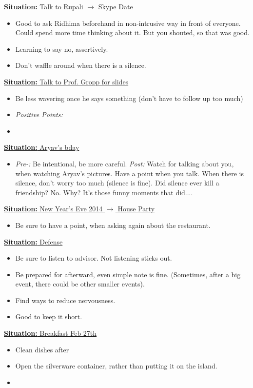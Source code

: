 \documentclass[11pt]{article}
\newcommand{\newSituation}[1]{\underline{\textbf{Situation:} #1} }
\begin{document}
\newSituation{Talk to Rupali $\rightarrow$ Skype Date} 
\begin{itemize}
\item Good to ask Ridhima beforehand in non-intrusive way in front of everyone. Could spend more time thinking about it. But you shouted, so that was good. 
\item Learning to say no, assertively.  
\item Don't waffle around when there is a silence. 
\end{itemize} 

\newSituation{Talk to Prof. Gropp for slides}
\begin{itemize} 
\tiny \item \tiny Be less wavering once he says something (don't have
to follow up too much) 
\item \textit{Positive Points:} 
\item
\end{itemize} 

\newSituation{Aryav's bday} 
\begin{itemize} 
\item  %
\textit{Pre-:} Be intentional, be more careful. \textit{Post:} Watch
for talking about you, when watching Aryav's pictures. Have a point when you
talk. When there is silence, don't worry too much (silence is
fine). Did silence ever kill a friendship? No. Why? It's those funny moments that did.... 
\end{itemize} 

\newSituation{New Year's Eve 2014 $\rightarrow$ House Party}
\begin{itemize} 
\item Be sure to have a point, when asking again about the restaurant. 
\end{itemize}

\newSituation{Defense} 
\begin{itemize} 
\item Be sure to listen to advisor. Not listening sticks out.
\item Be prepared for afterward, even simple note is fine. (Sometimes,
  after a big event, there could be other smaller events). 
\item Find ways to reduce nervousness. 
\item Good to keep it short. 
\end{itemize} 

\newSituation{Breakfast Feb 27th} 
\begin{itemize} 
\item Clean dishes after
\item Open the silverware container, rather than putting it on the
  island. 
\item 
\end{itemize}
\end{document}
